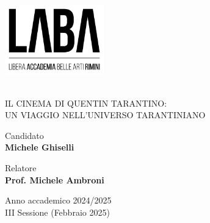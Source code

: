 \documentclass[12pt]{article} %
\begin{document}
\begin{titlepage}
    \begin{spacing}{0.8}
    \begin{center}
        \includegraphics[height=3cm]{labalogo.png}
        \vspace*{1cm}


        \vspace*{2cm}
        
        \\\vspace{0.5cm}
        \large
        IL CINEMA DI QUENTIN TARANTINO:\\ UN VIAGGIO NELL'UNIVERSO TARANTINIANO

        \normalsize
        \vspace*{4cm}

        \begin{minipage}[t]{0.47\textwidth}
	       {Candidato} \vspace{0.3em} \\
              {\large \textbf{Michele Ghiselli}} \vspace{1em}  \\
        \end{minipage}
        \hfill
        \begin{minipage}[t]{0.47\textwidth}\raggedleft
	       {Relatore} \hspace{-0.9em} \vspace{0.3em} \\
              {\large \textbf{Prof. Michele Ambroni}} %
        \end{minipage}

        \vfill
        Anno accademico 2024/2025\\
        III Sessione (Febbraio 2025)
    \end{center}
    \end{spacing}
\end{titlepage}
\end{document}
